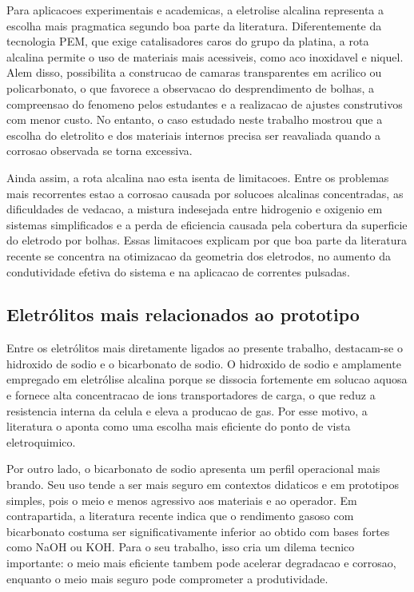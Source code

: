 \documentclass[12pt,oneside,a4paper,english,brazilian]{abntex2}
\begin{document}
Para aplicacoes experimentais e academicas, a eletrolise alcalina representa a escolha mais pragmatica segundo boa parte da literatura. Diferentemente da tecnologia PEM, que exige catalisadores caros do grupo da platina, a rota alcalina permite o uso de materiais mais acessiveis, como aco inoxidavel e niquel. Alem disso, possibilita a construcao de camaras transparentes em acrilico ou policarbonato, o que favorece a observacao do desprendimento de bolhas, a compreensao do fenomeno pelos estudantes e a realizacao de ajustes construtivos com menor custo. No entanto, o caso estudado neste trabalho mostrou que a escolha do eletrolito e dos materiais internos precisa ser reavaliada quando a corrosao observada se torna excessiva.

Ainda assim, a rota alcalina nao esta isenta de limitacoes. Entre os problemas mais recorrentes estao a corrosao causada por solucoes alcalinas concentradas, as dificuldades de vedacao, a mistura indesejada entre hidrogenio e oxigenio em sistemas simplificados e a perda de eficiencia causada pela cobertura da superficie do eletrodo por bolhas. Essas limitacoes explicam por que boa parte da literatura recente se concentra na otimizacao da geometria dos eletrodos, no aumento da condutividade efetiva do sistema e na aplicacao de correntes pulsadas.

\subsection{Eletrólitos mais relacionados ao prototipo}

Entre os eletrólitos mais diretamente ligados ao presente trabalho, destacam-se o hidroxido de sodio e o bicarbonato de sodio. O hidroxido de sodio e amplamente empregado em eletrólise alcalina porque se dissocia fortemente em solucao aquosa e fornece alta concentracao de ions transportadores de carga, o que reduz a resistencia interna da celula e eleva a producao de gas. Por esse motivo, a literatura o aponta como uma escolha mais eficiente do ponto de vista eletroquimico.

Por outro lado, o bicarbonato de sodio apresenta um perfil operacional mais brando. Seu uso tende a ser mais seguro em contextos didaticos e em prototipos simples, pois o meio e menos agressivo aos materiais e ao operador. Em contrapartida, a literatura recente indica que o rendimento gasoso com bicarbonato costuma ser significativamente inferior ao obtido com bases fortes como NaOH ou KOH. Para o seu trabalho, isso cria um dilema tecnico importante: o meio mais eficiente tambem pode acelerar degradacao e corrosao, enquanto o meio mais seguro pode comprometer a produtividade.
\end{document}
